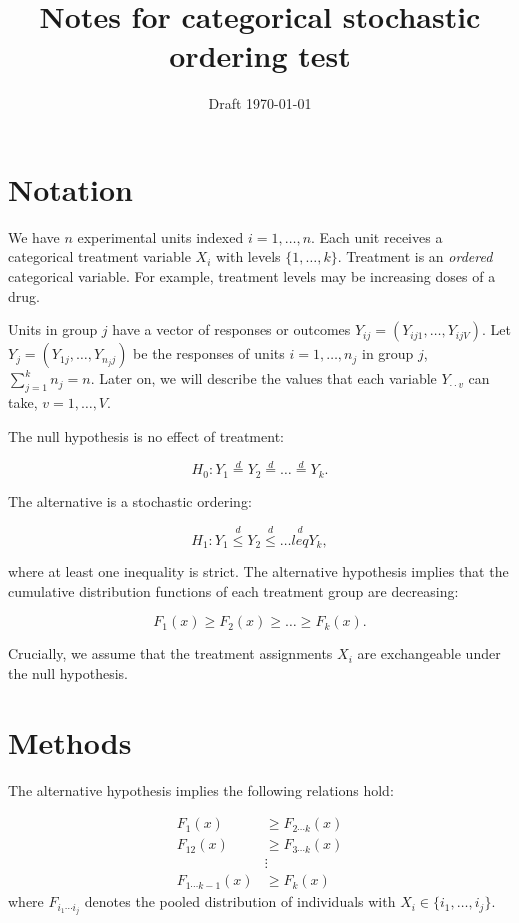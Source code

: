 \documentclass[12pt]{article}
\title{Notes for categorical stochastic ordering test}
\author{}
\date{Draft \today}
\newcommand{\todo}[1]{{\color{red}{TO DO: \sc #1}}}
\begin{document}
\maketitle


\section{Notation}

We have $n$ experimental units indexed $i=1, \ldots, n$.
Each unit receives a categorical treatment variable $X_i$ with levels $\{1, \ldots, k\}$.
Treatment is an \emph{ordered} categorical variable.
For example, treatment levels may be increasing doses of a drug.

Units in group $j$ have a vector of responses or outcomes $Y_{ij} = (Y_{ij1}, \ldots, Y_{ijV})$.
Let $Y_j = (Y_{1j}, \ldots, Y_{n_j j})$ be the responses of units $i=1, \ldots, n_j$ in group $j$, $\sum_{j=1}^k n_j = n$.
Later on, we will describe the values that each variable $Y_{\cdot \cdot v}$ can take, $v = 1, \ldots, V$.

The null hypothesis is no effect of treatment:

$$H_0: Y_1 \stackrel{d}{=} Y_2 \stackrel{d}{=} \ldots \stackrel{d}{=} Y_k.$$

The alternative is a stochastic ordering:

$$H_1: Y_1 \stackrel{d}{\leq} Y_2 \stackrel{d}{\leq} \ldots \stackrel{d}{leq} Y_k,$$

where at least one inequality is strict.
The alternative hypothesis implies that the cumulative distribution functions of each treatment group
are decreasing:

$$F_1(x) \geq F_2(x) \geq \ldots \geq F_k(x).$$

Crucially, we assume that the treatment assignments $X_i$ are exchangeable under the null hypothesis.

\section{Methods}

\todo{Brombin and Di Serio (2016) lays out the notation for this very nicely. Let's rewrite based on their Section 3.}

The alternative hypothesis implies the following relations hold:

\begin{align*}
F_1(x) &\geq F_{2 \cdots k}(x) \\
F_{12}(x) &\geq F_{3 \cdots k}(x) \\
&\vdots \\
F_{1 \cdots k-1}(x) &\geq F_{k}(x)
\end{align*}
where $F_{i_1 \cdots i_j}$ denotes the pooled distribution of individuals with $X_i \in \{i_1, \ldots, i_j\}$.
\end{document}
